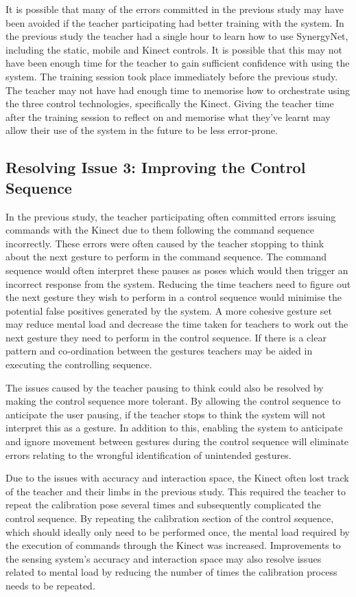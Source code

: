 \documentclass[manuscript, review, screen]{acmart}
\begin{document}
It is possible that many of the errors committed in the previous study may have been avoided if the teacher participating had better training with the system.
In the previous study the teacher had a single hour to learn how to use SynergyNet, including the static, mobile and Kinect controls.
It is possible that this may not have been enough time for the teacher to gain sufficient confidence with using the system.
The training session took place immediately before the previous study.
The teacher may not have had enough time to memorise how to orchestrate using the three control technologies, specifically the Kinect.
Giving the teacher time after the training session to reflect on and memorise what they've learnt may allow their use of the system in the future to be less error-prone.

\subsection{Resolving Issue 3: Improving the Control Sequence}
\label{sec:improveMentalLoad}

In the previous study, the teacher participating often committed errors issuing commands with the Kinect due to them following the command sequence incorrectly.
These errors were often caused by the teacher stopping to think about the next gesture to perform in the command sequence.
The command sequence would often interpret these pauses as poses which would then trigger an incorrect response from the system.
Reducing the time teachers need to figure out the next gesture they wish to perform in a control sequence would minimise the potential false positives generated by the system.
A more cohesive gesture set may reduce mental load and decrease the time taken for teachers to work out the next gesture they need to perform in the control sequence.
If there is a clear pattern and co-ordination between the gestures teachers may be aided in executing the controlling sequence.

The issues caused by the teacher pausing to think could also be resolved by making the control sequence more tolerant.
By allowing the control sequence to anticipate the user pausing, if the teacher stops to think the system will not interpret this as a gesture.
In addition to this, enabling the system to anticipate and ignore movement between gestures during the control sequence will eliminate errors relating to the wrongful identification of unintended gestures.

Due to the issues with accuracy and interaction space, the Kinect often lost track of the teacher and their limbs in the previous study.
This required the teacher to repeat the calibration pose several times and subsequently complicated the control sequence.
By repeating the calibration section of the control sequence, which should ideally only need to be performed once, the mental load required by the execution of commands through the Kinect was increased.
Improvements to the sensing system's accuracy and interaction space may also resolve issues related to mental load by reducing the number of times the calibration process needs to be repeated.
\end{document}
